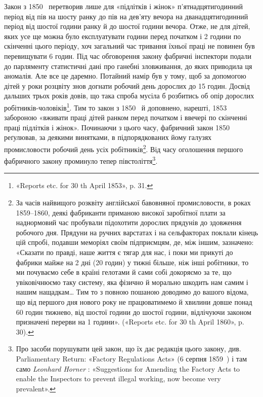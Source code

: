 
Закон з 1850~ перетворив лише для «підлітків і жінок»
п’ятнадцятигодинний період від пів на шосту ранку до пів на
дев’яту вечора на дванадцятигодинний період від шостої години
ранку й до шостої години вечора. Отже, не для дітей, яких усе
ще можна було експлуатувати  години перед початком і 2
години по скінченні цього періоду, хоч загальний час тривання
їхньої праці не повинен був перевищувати 6 годин. Під час обговорення
закону фабричні інспектори подали до парляменту статистичні
дані про ганебні зловживання, до яких приводила ця
аномалія. Але все це даремно. Потайний намір був у тому, щоб
за допомогою дітей у роки розцвіту знов догнати робочий день
дорослих до 15 годин. Досвід дальших трьох років довів, що
така спроба мусіла б розбитись об опір дорослих робітників-чоловіків\footnote{
«Reports etc. for 30 th April 1853», p. 31.
}.
Тим то закон з 1850~ й доповнено, нарешті, 1853~
забороною «вживати праці дітей ранком перед початком і ввечері
по скінченні праці підлітків і жінок». Починаючи з цього часу,
фабричний закон 1850~ реґулював, за деякими винятками, в
підпорядкованих йому галузях промисловости робочий день усіх
робітників\footnote{
За часів найвищого розквіту англійської бавовняної промисловости,
в роках 1859--1860, деякі фабриканти приманою високої заробітної
плати за наднормовий час пробували підохотити дорослих прядунів до
здовження робочого дня. Прядуни на ручних варстатах і на сельфакторах
поклали кінець цій спробі, подавши меморіял своїм підприємцям, де, між
іншим, зазначено: «Сказати по правді, наше життя є тягар для нас, і
поки ми прикуті до фабрики майже на 2 дні (20 годин) у тижні
більше, ніж інші робітники, то ми почуваємо себе в країні гелотами й
сами собі докоряємо за те, що увіковічнюємо таку систему, яка фізично
й морально шкодить нам самим і нашим нащадкам\dots{} Тим то з повною
пошаною доводимо до вашого відома, що від першого дня нового року
не працюватимемо й хвилини довше понад 60 годин тижнево, від шостої
години до шостої години, відлічуючи законом призначені перерви на
1 години». («Reports etc. for 30 th April 1860», p. 30).
}. Від часу оголошення першого фабричного закону
проминуло тепер півстоліття\footnote{
Про засоби порушувати цей закон, що їх дає редакція цього закону,
див. Parliamentary Return: «Factory Regulations Acts» (6 серпня 1859~) і
там само \emph{Leonhard Horner} : «Suggestions for Amending the Factory Acts to
enable the Inspectors to prevent illegal working, now become very prevalent».
}.

